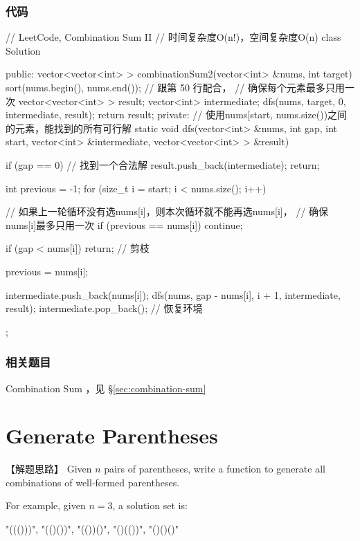 \subsubsection{代码}
\begin{Code}
	// LeetCode, Combination Sum II
	// 时间复杂度O(n!)，空间复杂度O(n)
	class Solution {
		public:
		vector<vector<int> > combinationSum2(vector<int> &nums, int target) {
			sort(nums.begin(), nums.end()); // 跟第 50 行配合，
			// 确保每个元素最多只用一次
			vector<vector<int> > result;
			vector<int> intermediate;
			dfs(nums, target, 0, intermediate, result);
			return result;
		}
		private:
		// 使用nums[start, nums.size())之间的元素，能找到的所有可行解
		static void dfs(vector<int> &nums, int gap, int start,
		vector<int> &intermediate, vector<vector<int> > &result) {
			if (gap == 0) {  //  找到一个合法解
				result.push_back(intermediate);
				return;
			}
			
			int previous = -1;
			for (size_t i = start; i < nums.size(); i++) {
				// 如果上一轮循环没有选nums[i]，则本次循环就不能再选nums[i]，
				// 确保nums[i]最多只用一次
				if (previous == nums[i]) continue;
				
				if (gap < nums[i]) return;  // 剪枝
				
				previous = nums[i];
				
				intermediate.push_back(nums[i]);
				dfs(nums, gap - nums[i], i + 1, intermediate, result);
				intermediate.pop_back();  // 恢复环境
			}
		}
	};
\end{Code}


\subsubsection{相关题目}
\begindot
\item Combination Sum ，见 \S \ref{sec:combination-sum}
\myenddot


\section{Generate Parentheses } %
\label{sec:generate-parentheses}


【解题思路】
Given $n$ pairs of parentheses, write a function to generate all combinations of well-formed parentheses.

For example, given $n = 3$, a solution set is:
\begin{Code}
	"((()))", "(()())", "(())()", "()(())", "()()()"
\end{Code}

